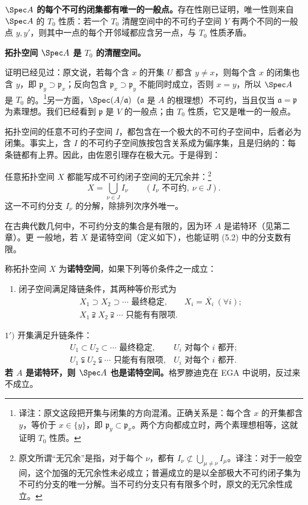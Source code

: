 \textbf{$\Spec A$ 的每个不可约闭集都有唯一的一般点。}存在性刚已证明，唯一性则来自 $\Spec A$ 的 $T_0$ 性质：若一个 $T_0$ 清醒空间中的不可约子空间 $Y$ 有两个不同的一般点 $y,y'$，则其中一点的每个开邻域都应含另一点，与 $T_0$ 性质矛盾。

\textbf{拓扑空间 $\Spec A$ 是 $T_0$ 的清醒空间。}

证明已经见过：原文说，若每个含 $x$ 的开集 $U$ 都含 $y\ne x$，则每个含 $x$ 的闭集也含 $y$，即 $\mathfrak p_y\supset\mathfrak p_x$；反向包含 $\mathfrak p_x\supset\mathfrak p_y$ 不能同时成立，否则 $x=y$，所以 $\Spec A$ 是 $T_0$ 的。\footnote{译注：原文这段把开集与闭集的方向混淆。正确关系是：每个含 $x$ 的开集都含 $y$，等价于 $x\in\overline{\{y\}}$，即 $\mathfrak p_y\subset\mathfrak p_x$。两个方向都成立时，两个素理想相等，这就证明 $T_0$ 性质。}另一方面，$\Spec(A/\mathfrak a)$（$\mathfrak a$ 是 $A$ 的根理想）不可约，当且仅当 $\mathfrak a=\mathfrak p$ 为素理想。我们已经看到 $\mathfrak p$ 是 $V$ 的一般点；由 $T_0$ 性质，它又是唯一的一般点。

拓扑空间的任意不可约子空间 $I$，都包含在一个极大的不可约子空间中，后者必为闭集。事实上，含 $I$ 的不可约子空间族按包含关系成为偏序集，且是归纳的：每条链都有上界。因此，由佐恩引理存在极大元。于是得到：

任意拓扑空间 $X$ 都能写成不可约闭子空间的无冗余并：\footnote{原文所谓“无冗余”是指，对于每个 $\nu$，都有 $I_\nu\not\subset\bigcup_{\mu\ne\nu}I_\mu$。译注：对于一般空间，这个加强的无冗余性未必成立；普遍成立的是以全部极大不可约闭子集为不可约分支的唯一分解。当不可约分支只有有限多个时，原文的无冗余性成立。}
\begin{equation}\tag{5.2}
X=\bigcup_{\nu\in J}I_\nu
\qquad(I_\nu\text{ 不可约},\ \nu\in J).
\end{equation}
这一不可约分支 $I_\nu$ 的分解，除排列次序外唯一。

在古典代数几何中，不可约分支的集合是有限的，因为环 $A$ 是诺特环（见第二章）。更
一般地，若 $X$ 是诺特空间（定义如下），也能证明 (5.2) 中的分支数有限。

称拓扑空间 $X$ 为\textbf{诺特空间}，如果下列等价条件之一成立：
\begin{enumerate}[label=\arabic*)]
\item 闭子空间满足降链条件，其两种等价形式为
\[
\begin{array}{ll}
X_1\supset X_2\supset\cdots\text{ 最终稳定},&X_i=\overline{X_i}\ (\forall i);\\
X_1\supsetneqq X_2\supsetneqq\cdots\text{ 只能有有限项}.&
\end{array}
\]
\end{enumerate}
$1')$ 开集满足升链条件：
\[
\begin{array}{ll}
U_1\subset U_2\subset\cdots\text{ 最终稳定},&U_i\text{ 对每个 $i$ 都开};\\
U_1\subsetneqq U_2\subsetneqq\cdots\text{ 只能有有限项},&U_i\text{ 对每个 $i$ 都开}.
\end{array}
\]
\textbf{若 $A$ 是诺特环，则 $\Spec A$ 也是诺特空间。}格罗滕迪克在 EGA 中说明，反过来不成立。

